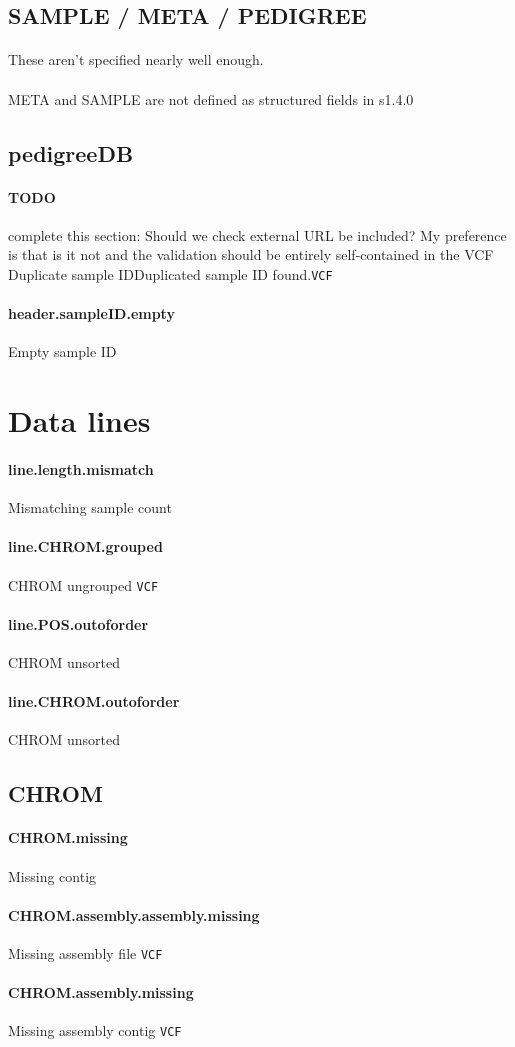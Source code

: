\documentclass[10pt]{article}
\newcommand{\vcfstrictrule}[5]{
	\paragraph{#1} #2 #4	
	#5
	\par
}
\newcommand{\vcfspec}{\tt VCF}
\newcommand{\SPECISSUE}[1]{\paragraph{} #1}
\newcommand{\TODO}[1]{\paragraph{TODO} complete this section: #1}
\newcommand{\externalfilevalidation}[5] {
	\TODO{Should we check external URL be included? My preference is that is it not and the validation should be entirely self-contained in the VCF}
}
\begin{document}
\subsection{SAMPLE / META / PEDIGREE }

\SPECISSUE{These aren't specified nearly well enough.}
\SPECISSUE{META and SAMPLE are not defined as structured fields in s1.4.0}

\subsection{pedigreeDB }

\externalfilevalidation{mi.pedigreeDB}

\section{Header}

\vcfstrictrule{header.sampleID.duplicate}{Duplicate sample ID}{Duplicated sample ID found.}{\vcfspec}{}
\vcfstrictrule{header.sampleID.empty}{Empty sample ID}{Header sample ID must be at least 1 character in length.}{}{}

\section{Data lines}

\vcfstrictrule{line.length.mismatch}{Mismatching sample count}{The number of sample genotype information has been provided for does not match the number of samples defined in the header.}{}{}
\vcfstrictrule{line.CHROM.grouped}{CHROM ungrouped}{Records are not grouped by CHROM.}{}{\vcfspec}{}
\vcfstrictrule{line.POS.outoforder}{CHROM unsorted}{Records grouped by CHROM are not in ascending order by POS.}{}{}
\vcfstrictrule{line.CHROM.outoforder}{CHROM unsorted}{CHROM ordering does not match the order of the meta-information contig records.}{}{}

\subsection{CHROM}

\vcfstrictrule{CHROM.missing}{Missing contig}{ No ##contig meta-information line found for this records. Does not apply to angle-bracketed ID Strings. }{}{}
\vcfstrictrule{CHROM.assembly.assembly.missing}{Missing assembly file}{ No assembly file specified using ##assembly. Applies only to angle-bracketed ID Strings. }{\vcfspec}{}
\vcfstrictrule{CHROM.assembly.missing}{Missing assembly contig}{ Assembly file contig identifier not found in the assembly file. Applies only to angle-bracketed ID Strings. }{\vcfspec}{}
\end{document}
